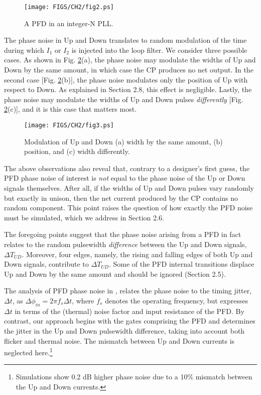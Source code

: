 \begin{figure}[htb!]
\centering
\texttt{[image: FIGS/CH2/fig2.ps]}
\caption{A PFD in an integer-N PLL.}
\label{fig:pll}
\end{figure}

The phase noise in Up and Down translates to random modulation of the time during which $I_1$ or $I_2$ is injected into the loop filter.
We consider three possible cases. As shown in Fig. \ref{fig:3cases}(a), the phase noise may modulate the widths of Up and Down by the same amount,
in which case the CP produces no net output. In the second case [Fig. \ref{fig:3cases}(b)], the phase noise modulates only the position of Up with
respect to Down. As explained in Section 2.8, this effect is negligible. Lastly, the phase noise may modulate the widths of Up and Down
pulses {\em differently} [Fig. \ref{fig:3cases}(c)], and it is this case that matters most.

\begin{figure}[htb!]
\centering
\texttt{[image: FIGS/CH2/fig3.ps]}
\caption{Modulation of Up and Down (a) width by the same amount, (b) position, and (c) width differently.}
\label{fig:3cases}
\end{figure}

The above observations also reveal that, contrary to a designer's first guess, the PFD phase noise of interest is {\em not} equal to
the phase noise of the Up or Down signals themselves. After all, if the widths of Up and Down pulses vary randomly but exactly in unison, then the
net current produced by the CP contains no random component. This point raises the question of how exactly the PFD noise must be
simulated, which we address in Section 2.6.

The foregoing points suggest that the phase noise arising from a PFD in fact relates to the random pulsewidth {\em difference} between the Up and
Down signals, $\Delta T_{UD}$. Moreover, four edges, namely, the rising and falling edges of both Up and Down signals, contribute to $\Delta
T_{UD}$. Some of the PFD internal transitions displace Up and Down by the same amount and should be
ignored (Section 2.5). 

The analysis of PFD phase noise in \cite{Brennan}, \cite{Thompson} relates the phase noise to the timing jitter, $\Delta t$, as $\Delta \phi _{in} =
2 \pi f_s \Delta t$, where $f_s$ denotes the operating frequency, but expresses $\Delta t$ in terms of the (thermal) noise factor and input
resistance of the PFD.
By contrast, our approach begins with the gates comprising the PFD and determines the jitter in the Up and Down pulsewidth difference, taking into
account both flicker and thermal noise. {The mismatch between Up and Down currents is neglected here.}\footnote{Simulations show 0.2 dB
higher phase noise due to a 10\% mismatch between the Up and Down currents.}


